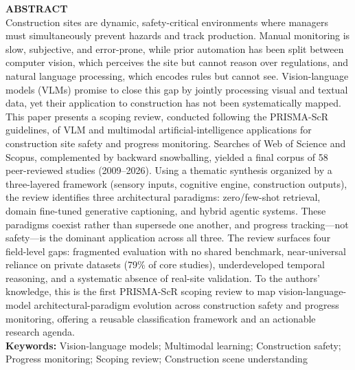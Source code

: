 \documentclass[10pt,letterpaper]{article}
\begin{document}
\begin{center}
\begin{minipage}{0.93\textwidth}
{\color{headingblue}\bfseries\small ABSTRACT}\\[0.3em]
{\small
Construction sites are dynamic, safety-critical environments where managers must simultaneously prevent hazards and track production. Manual monitoring is slow, subjective, and error-prone, while prior automation has been split between computer vision, which perceives the site but cannot reason over regulations, and natural language processing, which encodes rules but cannot see. Vision-language models (VLMs) promise to close this gap by jointly processing visual and textual data, yet their application to construction has not been systematically mapped. This paper presents a scoping review, conducted following the PRISMA-ScR guidelines, of VLM and multimodal artificial-intelligence applications for construction site safety and progress monitoring. Searches of Web of Science and Scopus, complemented by backward snowballing, yielded a final corpus of 58 peer-reviewed studies (2009--2026). Using a thematic synthesis organized by a three-layered framework (sensory inputs, cognitive engine, construction outputs), the review identifies three architectural paradigms: zero/few-shot retrieval, domain fine-tuned generative captioning, and hybrid agentic systems. These paradigms coexist rather than supersede one another, and progress tracking---not safety---is the dominant application across all three. The review surfaces four field-level gaps: fragmented evaluation with no shared benchmark, near-universal reliance on private datasets (79\% of core studies), underdeveloped temporal reasoning, and a systematic absence of real-site validation. To the authors' knowledge, this is the first PRISMA-ScR scoping review to map vision-language-model architectural-paradigm evolution across construction safety and progress monitoring, offering a reusable classification framework and an actionable research agenda.
}\\[0.4em]
{\small\textbf{Keywords:} Vision-language models; Multimodal learning; Construction safety; Progress monitoring; Scoping review; Construction scene understanding}
\end{minipage}
\end{center}

\vspace{0.4em}

\end{document}
